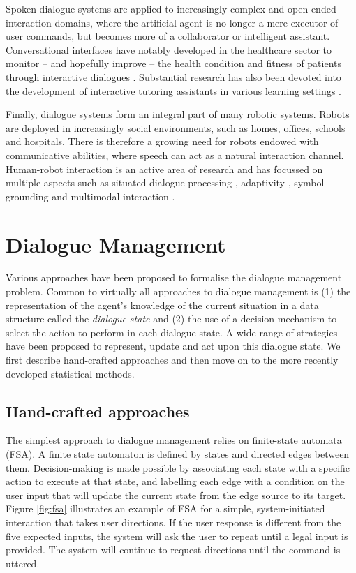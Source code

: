 Spoken dialogue systems are applied to increasingly complex and open-ended interaction domains, where the artificial agent is no longer a mere executor of user commands, but becomes more of a collaborator or intelligent assistant.  Conversational interfaces have notably developed in the healthcare sector to monitor -- and hopefully improve -- the health condition and fitness of patients through interactive dialogues \citep{BickmoreG06,Stahl:2009,MorbiniFDSTR12}.  Substantial research has also been devoted into the development of interactive tutoring assistants in various learning settings \citep{ChiVLJ11,Dzikovska:2011,jan2011,TraumAAFGKLNS12}. 

Finally, dialogue systems form an integral part of many robotic systems.  Robots are deployed in increasingly social environments, such as homes, offices, schools and hospitals.  There is therefore a growing need for robots endowed with communicative abilities, where speech can act as a natural interaction channel. Human-robot interaction is an active area of research and has focussed on multiple aspects such as situated dialogue processing \citep{CantrellSSW10,cosybook:dialogue}, adaptivity \citep{DoshiR08}, symbol grounding \citep{Roy05,lemaignan2012} and multimodal interaction \citep{stiefelhagen2004,salem2012,MirnigWSMGBGT13}.
 
\section{Dialogue Management}
\label{sec:dm}

Various approaches have been proposed to formalise the dialogue management problem.  Common to virtually all approaches to dialogue management is (1) the representation of the agent's knowledge of the current situation in a data structure called the \textit{dialogue state} and (2) the use of a decision mechanism to select the action to perform in each dialogue state. A wide range of strategies have been proposed to represent, update and act upon this dialogue state.  We first describe hand-crafted approaches and then move on to the more recently developed statistical methods. 

\subsection{Hand-crafted approaches}
\label{sec:handcrafted}
The simplest approach to dialogue management relies on finite-state automata (FSA).  A finite state automaton is defined by states and directed edges between them.  Decision-making is made possible by associating each state with a specific action to execute at that state, and labelling each edge with a condition on the user input that will update the current state from the edge source to its target.  Figure \ref{fig:fsa} illustrates an example of FSA for a simple, system-initiated interaction that takes user directions.  If the user response is different from the five expected inputs, the system will ask the user to repeat until a legal input is provided.  The system will continue to request directions until the  command is uttered. 

